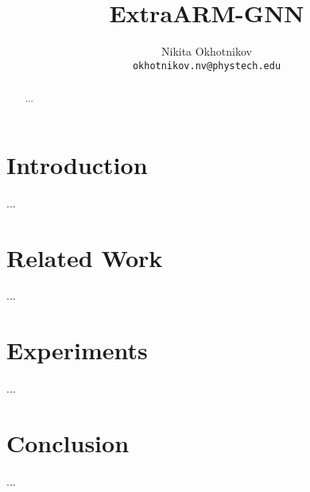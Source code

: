 \documentclass{article}
\title{ExtraARM-GNN}
\author{Nikita Okhotnikov\\
	\texttt{okhotnikov.nv@phystech.edu} \\
}
\date{}
\begin{document}
\maketitle
\begin{abstract}
    ...
\end{abstract}

\section{Introduction}
    ...
\section{Related Work}
    ...
\section{Experiments}
    ... 
\section{Conclusion}
    ...
\end{document}
